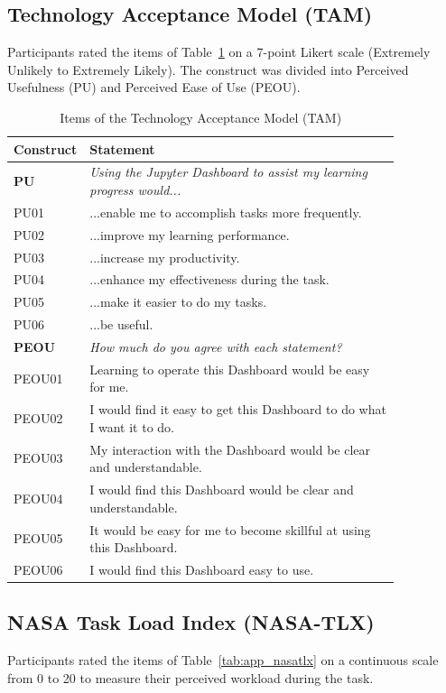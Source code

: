 \documentclass[acmsmall]{acmart}
\begin{document}
\subsection{Technology Acceptance Model (TAM)}
Participants rated the items of Table~\ref{tab:app_tam} on a 7-point Likert scale (Extremely Unlikely to Extremely Likely). The construct was divided into Perceived Usefulness (PU) and Perceived Ease of Use (PEOU).

\begin{table}[htpb]
  \centering
  \caption{Items of the Technology Acceptance Model (TAM)}
  \label{tab:app_tam}
  \begin{tabular}{lp{0.85\linewidth}}
    \toprule
    \textbf{Construct} & \textbf{Statement} \\
    \midrule
    \textbf{PU} & \textit{Using the Jupyter Dashboard to assist my learning progress would...} \\
    PU01 & ...enable me to accomplish tasks more frequently. \\
    PU02 & ...improve my learning performance. \\
    PU03 & ...increase my productivity. \\
    PU04 & ...enhance my effectiveness during the task. \\
    PU05 & ...make it easier to do my tasks. \\
    PU06 & ...be useful. \\
    \midrule
    \textbf{PEOU} & \textit{How much do you agree with each statement?} \\
    PEOU01 & Learning to operate this Dashboard would be easy for me. \\
    PEOU02 & I would find it easy to get this Dashboard to do what I want it to do. \\
    PEOU03 & My interaction with the Dashboard would be clear and understandable. \\
    PEOU04 & I would find this Dashboard would be clear and understandable. \\
    PEOU05 & It would be easy for me to become skillful at using this Dashboard. \\
    PEOU06 & I would find this Dashboard easy to use. \\
    \bottomrule
  \end{tabular}
\end{table}

\subsection{NASA Task Load Index (NASA-TLX)}
Participants rated the items of Table~\ref{tab:app_nasatlx} on a continuous scale from 0 to 20 to measure their perceived workload during the task.
\end{document}
